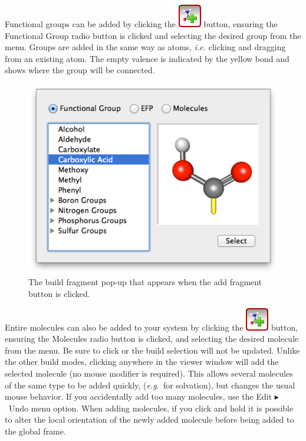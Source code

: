 \documentclass[a4paper,12pt]{article}
\newcommand{\bt}{\ensuremath{\blacktriangleright}}
\newcommand{\eg}{\emph{e.g.}}
\begin{document}
Functional groups can be added by clicking the
\includegraphics[scale=0.40]{figures/BuildFragButton.png} button, ensuring the
Functional Group radio button is clicked and selecting the desired group from
the menu.  Groups are added in the same way as atoms, \emph{i.e.} clicking and
dragging from an existing atom.  The empty valence is indicated by the yellow
bond and shows where the group will be connected.
\begin{figure}
\begin{center}
\includegraphics[scale=0.5]{figures/FunctionalGroup.png}
\caption{The build fragment pop-up that appears when the add fragment button
is clicked.} 
\end{center}
\end{figure}


Entire molecules can also be added to your system by clicking the
\includegraphics[scale=0.40]{figures/BuildFragButton.png} button, ensuring the
Molecules radio button is clicked, and selecting the desired molecule from the
menu.  Be sure to click  or the build selection will not be
updated.  Unlike the other build modes, clicking anywhere in the viewer window
will add the selected molecule (no mouse modifier is required).  This allows
several molecules of the same type to be added quickly, (\eg\ for
solvation), but changes the usual mouse behavior.  If you accidentally add too
many molecules, use the Edit \bt\ Undo menu option.  When adding molecules, if
you click and hold it is possible to alter the local orientation of the newly
added molecule before being added to the global frame.
\end{document}
